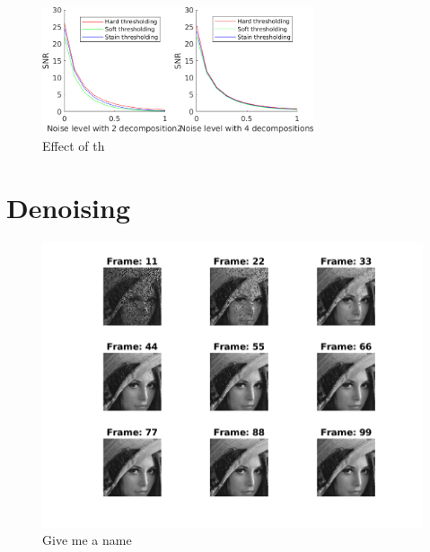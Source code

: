 \documentclass[a4paper,12pt]{article}
\begin{document}
\begin{figure}[t]   
        \centering
        \includegraphics[width=8cm]{../Results/noise_levels.png}
        \caption{Effect of th}
		\label{fig:noiselevel}
\end{figure}


\section{Denoising}
\begin{figure}[t]
        \centering
        \includegraphics{../Videos/lena_primal_frames.png}
        \caption{Give me a name} 
		\label{fig:denoise_video}
\end{figure}
\end{document}
